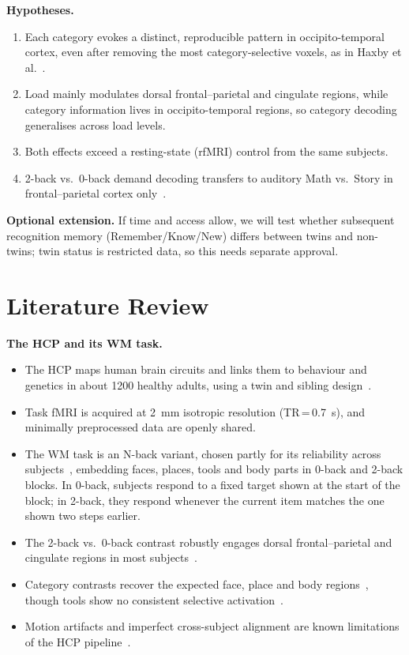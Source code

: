 \documentclass[10pt,a4paper]{article}
\begin{document}
\textbf{Hypotheses.}
\begin{enumerate}[label=\textbf{H\arabic*.}, leftmargin=2em]
  \item Each category evokes a distinct, reproducible pattern in occipito-temporal cortex, even after removing the most category-selective voxels, as in Haxby et al.~\cite{haxby2001}.
  \item Load mainly modulates dorsal frontal--parietal and cingulate regions, while category information lives in occipito-temporal regions, so category decoding generalises across load levels.
  \item Both effects exceed a resting-state (rfMRI) control from the same subjects.
  \item 2-back vs.\ 0-back demand decoding transfers to auditory Math vs.\ Story in frontal--parietal cortex only~\cite{duncan2010}.
\end{enumerate}
\textbf{Optional extension.} If time and access allow, we will test whether subsequent recognition memory (Remember/Know/New) differs between twins and non-twins; twin status is restricted data, so this needs separate approval.

\section{Literature Review}
\textbf{\sffamily\color{accent}The HCP and its WM task.}
\begin{itemize}
  \item The HCP maps human brain circuits and links them to behaviour and genetics in about 1200 healthy adults, using a twin and sibling design~\cite{vanessen2013}.
  \item Task fMRI is acquired at 2~mm isotropic resolution (TR\,=\,0.7~s), and minimally preprocessed data are openly shared.
  \item The WM task is an N-back variant, chosen partly for its reliability across subjects~\cite{drobyshevsky2006}, embedding faces, places, tools and body parts in 0-back and 2-back blocks. In 0-back, subjects respond to a fixed target shown at the start of the block; in 2-back, they respond whenever the current item matches the one shown two steps earlier.
  \item The 2-back vs.\ 0-back contrast robustly engages dorsal frontal--parietal and cingulate regions in most subjects~\cite{vanessen2013,barch2013}.
  \item Category contrasts recover the expected face, place and body regions~\cite{barch2013,kanwisher1997,epstein1998,downing2001}, though tools show no consistent selective activation~\cite{barch2013}.
  \item Motion artifacts and imperfect cross-subject alignment are known limitations of the HCP pipeline~\cite{vanessen2013}.
\end{itemize}
\end{document}
